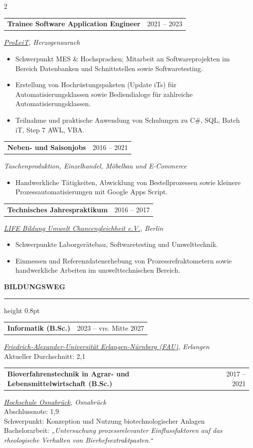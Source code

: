 \documentclass[10pt,a4paper]{article}
\makeatletter
\newcommand{\mainheading}[1]{%
  \vspace{12pt}%
  {\large\bfseries\color{accent}\MakeUppercase{#1}}\par
  \vspace{2pt}%
  {\color{accent}\hrule height 0.8pt}%
  \vspace{8pt}%
}
\newcommand{\cventry}[2]{%
  \begin{tabularx}{\linewidth}{@{}X@{\hspace{10pt}}r@{}}
    \textbf{#1} & {\small\color{textmuted}#2} \\
  \end{tabularx}\par\vspace{1pt}%
}
\makeatother
\begin{document}
\begin{paracol}{2}
\begin{rightcolumn}
\cventry{Trainee Software Application Engineer}{2021 -- 2023}
{\small\textit{\href{https://www.proleit.de/}{ProLeiT}, Herzogenaurach}}
\begin{itemize}
  \item Schwerpunkt MES \& Hochsprachen; Mitarbeit an Softwareprojekten im Bereich Datenbanken und Schnittstellen sowie Softwaretesting.
  \item Erstellung von Hochrüstungspaketen (Update iTs) für Automatisierungsklassen sowie Bediendialoge für zahlreiche Automatisierungsklassen.
  \item Teilnahme und praktische Anwendung von Schulungen zu  C\#, SQL, Batch iT, Step 7 AWL, VBA.
\end{itemize}
\vspace{9pt}

\cventry{Neben- und Saisonjobs}{2016 -- 2021}
{\small\textit{Taschenproduktion, Einzelhandel, Möbelbau und E-Commerce}}
\begin{itemize}
  \item Handwerkliche Tätigkeiten, Abwicklung von Bestellprozessen sowie kleinere Prozessautomatisierungen mit Google Apps Script.
\end{itemize}
\vspace{9pt}

\cventry{Technisches Jahrespraktikum}{2016 -- 2017}
{\small\textit{\href{https://life-online.de/project/entertechnik/}{LIFE Bildung Umwelt Chancengleichheit e.V.}, Berlin}}
\begin{itemize}
  \item Schwerpunkte Laborgerätebau, Softwaretesting und Umwelttechnik.
  \item Einmessen und Referenzdatenerhebung von Prozessrefraktometern sowie handwerkliche Arbeiten im umwelttechnischen Bereich.
\end{itemize}

\mainheading{Bildungsweg}

\cventry{Informatik (B.Sc.)}{2023 -- vrs. Mitte 2027}
{\small\textit{\href{https://www.fau.de/}{Friedrich-Alexander-Universität Erlangen-Nürnberg (FAU)}, Erlangen}}\\
{\small Aktueller Durchschnitt: 2,1}
\vspace{9pt}

\cventry{Bioverfahrenstechnik in Agrar- und Lebensmittelwirtschaft (B.Sc.)}{2017 -- 2021}
{\small\textit{\href{https://www.hs-osnabrueck.de/}{Hochschule Osnabrück}, Osnabrück}}\\
{\small Abschlussnote: 1,9}\\
{\small Schwerpunkt: Konzeption und Nutzung biotechnologischer Anlagen}\\
{\small Bachelorarbeit: \textit{„Untersuchung prozessrelevanter Einflussfaktoren auf das rheologische Verhalten von Bierhefeextraktpasten.“}}
\vspace{9pt}


\end{rightcolumn}
\end{paracol}
\end{document}
